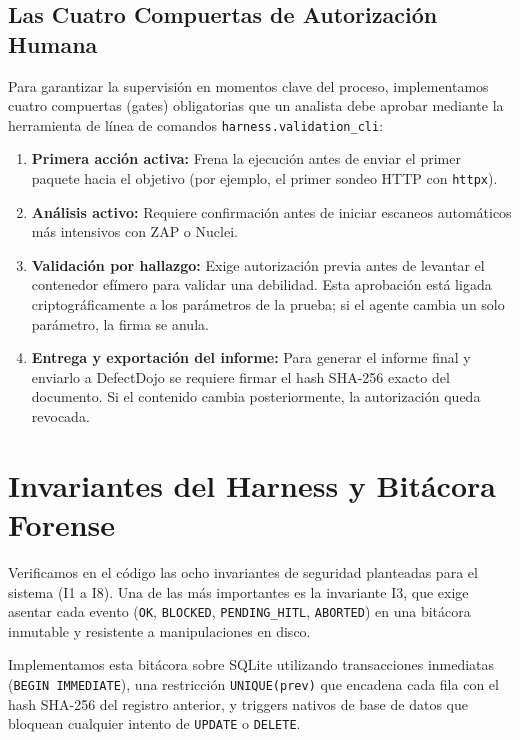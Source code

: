 \documentclass[10pt,a4paper]{article}
\begin{document}
\subsection{Las Cuatro Compuertas de Autorización Humana}

Para garantizar la supervisión en momentos clave del proceso, implementamos cuatro compuertas (gates) obligatorias que un analista debe aprobar mediante la herramienta de línea de comandos \texttt{harness.validation\_cli}:

\begin{enumerate}[leftmargin=*,noitemsep]
    \item \textbf{Primera acción activa:} Frena la ejecución antes de enviar el primer paquete hacia el objetivo (por ejemplo, el primer sondeo HTTP con \texttt{httpx}).
    \item \textbf{Análisis activo:} Requiere confirmación antes de iniciar escaneos automáticos más intensivos con ZAP o Nuclei.
    \item \textbf{Validación por hallazgo:} Exige autorización previa antes de levantar el contenedor efímero para validar una debilidad. Esta aprobación está ligada criptográficamente a los parámetros de la prueba; si el agente cambia un solo parámetro, la firma se anula.
    \item \textbf{Entrega y exportación del informe:} Para generar el informe final y enviarlo a DefectDojo se requiere firmar el hash SHA-256 exacto del documento. Si el contenido cambia posteriormente, la autorización queda revocada.
\end{enumerate}

\section{Invariantes del Harness y Bitácora Forense}

Verificamos en el código las ocho invariantes de seguridad planteadas para el sistema (I1 a I8). Una de las más importantes es la invariante I3, que exige asentar cada evento (\texttt{OK}, \texttt{BLOCKED}, \texttt{PENDING\_HITL}, \texttt{ABORTED}) en una bitácora inmutable y resistente a manipulaciones en disco.

Implementamos esta bitácora sobre SQLite utilizando transacciones inmediatas (\texttt{BEGIN IMMEDIATE}), una restricción \texttt{UNIQUE(prev)} que encadena cada fila con el hash SHA-256 del registro anterior, y triggers nativos de base de datos que bloquean cualquier intento de \texttt{UPDATE} o \texttt{DELETE}.
\end{document}
